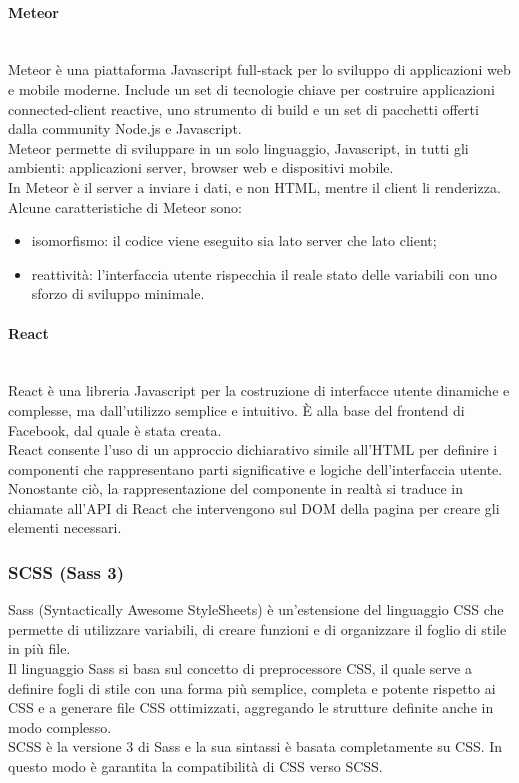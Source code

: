 \paragraph{Meteor}\mbox{}\\
Meteor è una piattaforma Javascript full-stack per lo sviluppo di applicazioni web e mobile moderne. Include un set di tecnologie chiave per costruire applicazioni connected-client reactive, uno strumento di build e un set di pacchetti offerti dalla community Node.js e Javascript.\\
Meteor permette di sviluppare in un solo linguaggio, Javascript, in tutti gli ambienti: applicazioni server, browser web e dispositivi mobile.\\
In Meteor è il server a inviare i dati, e non HTML, mentre il client li renderizza.
Alcune caratteristiche di Meteor sono:
\begin{itemize}
	\item isomorfismo: il codice viene eseguito sia lato server che lato client;
	\item reattività: l'interfaccia utente rispecchia il reale stato delle variabili con uno sforzo di sviluppo minimale.
\end{itemize}

\paragraph{React}\mbox{}\\
React è una libreria Javascript per la costruzione di interfacce utente dinamiche e complesse, ma dall'utilizzo semplice e intuitivo. È alla base del frontend di Facebook, dal quale è stata creata.\\
React consente l'uso di un approccio dichiarativo simile all'HTML per definire i componenti che rappresentano parti significative e logiche dell'interfaccia utente. Nonostante ciò, la rappresentazione del componente in realtà si traduce in chiamate all'API di React che intervengono sul DOM della pagina per creare gli elementi necessari.

\subsubsection{SCSS (Sass 3)}
Sass (Syntactically Awesome StyleSheets) è un'estensione del linguaggio CSS che permette di utilizzare variabili, di creare funzioni e di organizzare il foglio di stile in più file.\\
Il linguaggio Sass si basa sul concetto di preprocessore CSS, il quale serve a definire fogli di stile con una forma più semplice, completa e potente rispetto ai CSS e a generare file CSS ottimizzati, aggregando le strutture definite anche in modo complesso.\\
SCSS è la versione 3 di Sass e la sua sintassi è basata completamente su CSS. In questo modo è garantita la compatibilità di CSS verso SCSS.

